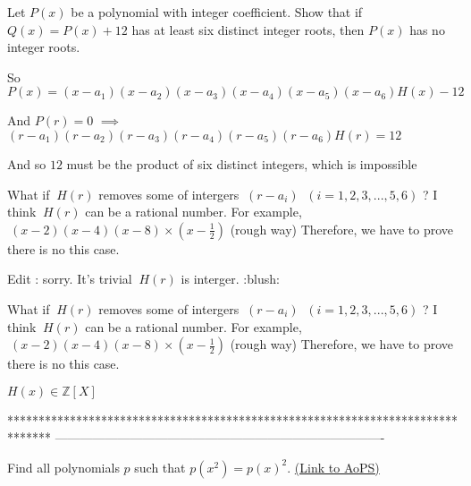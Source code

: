 \begin{solution}
	\begin{tcolorbox}Let $P(x)$ be a polynomial with integer coefficient. Show that if $Q(x) = P(x) + 12$ has at least six distinct integer roots, then $P(x)$ has no integer roots.\end{tcolorbox}
So $P(x)=(x-a_1)(x-a_2)(x-a_3)(x-a_4)(x-a_5)(x-a_6)H(x)-12$

And $P(r)=0$ $\implies$ $(r-a_1)(r-a_2)(r-a_3)(r-a_4)(r-a_5)(r-a_6)H(r)=12$

And so $12$ must be the product of six distinct integers, which is impossible
\end{solution}



\begin{solution}
	What if $\ H(r) $ removes some of intergers $\ (r-a_{i}) $   $\ (i=1,2,3,...,5,6) $ ?
I think $\ H(r) $ can be a rational number.
For example, $\ (x-2)(x-4)(x-8) \times (x-\frac{1}{2}) $ (rough way)
Therefore, we have to prove there is no this case.

Edit : sorry. It's trivial $\ H(r) $ is interger. :blush:
\end{solution}



\begin{solution}
	\begin{tcolorbox}What if $\ H(r) $ removes some of intergers $\ (r-a_{i}) $   $\ (i=1,2,3,...,5,6) $ ?
I think $\ H(r) $ can be a rational number.
For example, $\ (x-2)(x-4)(x-8) \times (x-\frac{1}{2}) $ (rough way)
Therefore, we have to prove there is no this case.\end{tcolorbox}
$H(x)\in\mathbb Z[X]$
\end{solution}
*******************************************************************************
-------------------------------------------------------------------------------

\begin{problem}
	Find all polynomials $p$ such that $p(x^{2})= p(x)^{2}$.
	\flushright \href{https://artofproblemsolving.com/community/c6h487150}{(Link to AoPS)}
\end{problem}



